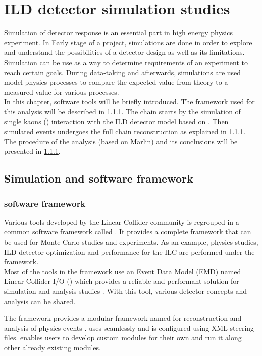 \chapter{ILD detector simulation studies}

Simulation of detector response is an essential part in high energy physics experiment. In Early stage of a project, simulations are done in order to explore and understand the possibilities of a detector design as well as its limitations. Simulation can be use as a way to determine requirements of an experiment to reach certain goals. During data-taking and afterwards, simulations are used model physics processes to compare  the expected value from theory to a measured value for various processes.\\

In this chapter, software tools will be briefly introduced. The \ilcsoft framework used for this analysis will be described in \ref{}. The chain starts by the simulation of single kaons (\kzeroL) interaction with the ILD detector model based on \geant. Then simulated events undergoes the full chain reconstruction as explained in \ref{}. The procedure of the analysis (based on Marlin) and its conclusions will be presented in \ref{}.

\section{Simulation and software framework}

\subsection{\ilcsoft software framework}

Various tools developed by the Linear Collider community is regrouped in a common software framework called \ilcsoft \cite{ILCSoftPortal}. It provides a complete framework that can be used for Monte-Carlo studies and experiments. As an example, physics studies, ILD detector optimization and performance for the ILC are performed under the \ilcsoft framework.\\

Most of the tools in the framework use an Event Data Model (EMD) named Linear Collider I/O (\lcio) which provides a reliable and performant solution for simulation and analysis studies \cite{Gaede:2003ip}. With this tool, various detector concepts and analysis can be shared.

The \ilcsoft framework provides a modular \cpp framework named \marlin for reconstruction and analysis of physics events \cite{Gaede:2006pj}. \marlin uses \lcio seamlessly and is configured using XML steering files. \marlin enables users to develop custom modules for their own and run it along other already existing modules.

